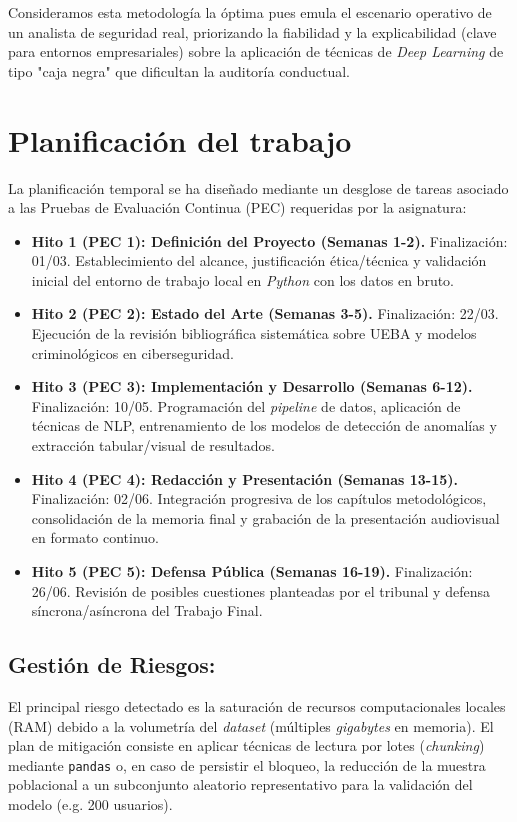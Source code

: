 \documentclass[IB]{TFUOC}%
\begin{document}
\noindent Consideramos esta metodología la óptima pues emula el escenario operativo de un analista de seguridad real, priorizando la fiabilidad y la explicabilidad (clave para entornos empresariales) sobre la aplicación de técnicas de \textit{Deep Learning} de tipo "caja negra" que dificultan la auditoría conductual.


\section{Planificación del trabajo}

La planificación temporal se ha diseñado mediante un desglose de tareas asociado a las Pruebas de Evaluación Continua (PEC) requeridas por la asignatura:

\begin{itemize}
    \item \textbf{Hito 1 (PEC 1): Definición del Proyecto (Semanas 1-2).} Finalización: 01/03. Establecimiento del alcance, justificación ética/técnica y validación inicial del entorno de trabajo local en \textit{Python} con los datos en bruto.
    \item \textbf{Hito 2 (PEC 2): Estado del Arte (Semanas 3-5).} Finalización: 22/03. Ejecución de la revisión bibliográfica sistemática sobre UEBA y modelos criminológicos en ciberseguridad.
    \item \textbf{Hito 3 (PEC 3): Implementación y Desarrollo (Semanas 6-12).} Finalización: 10/05. Programación del \textit{pipeline} de datos, aplicación de técnicas de NLP, entrenamiento de los modelos de detección de anomalías y extracción tabular/visual de resultados.
    \item \textbf{Hito 4 (PEC 4): Redacción y Presentación (Semanas 13-15).} Finalización: 02/06. Integración progresiva de los capítulos metodológicos, consolidación de la memoria final y grabación de la presentación audiovisual en formato continuo.
    \item \textbf{Hito 5 (PEC 5): Defensa Pública (Semanas 16-19).} Finalización: 26/06. Revisión de posibles cuestiones planteadas por el tribunal y defensa síncrona/asíncrona del Trabajo Final.
\end{itemize}

\subsection{Gestión de Riesgos:}

El principal riesgo detectado es la saturación de recursos computacionales locales (RAM) debido a la volumetría del \textit{dataset} (múltiples \textit{gigabytes} en memoria). El plan de mitigación consiste en aplicar técnicas de lectura por lotes (\textit{chunking}) mediante \texttt{pandas} o, en caso de persistir el bloqueo, la reducción de la muestra poblacional a un subconjunto aleatorio representativo para la validación del modelo (e.g. 200 usuarios).
\end{document}
